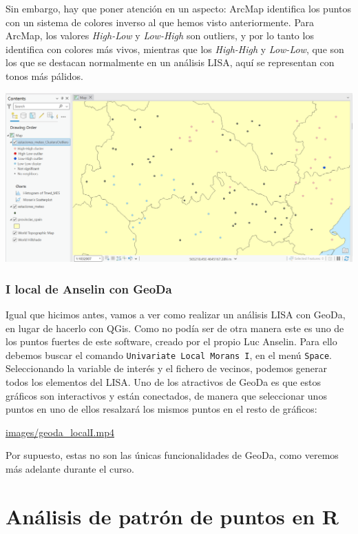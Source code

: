 \documentclass[
  letterpaper,
  DIV=11,
  numbers=noendperiod]{scrreprt}
\begin{document}
Sin embargo, hay que poner atención en un aspecto: ArcMap identifica los
puntos con un sistema de colores inverso al que hemos visto
anteriormente. Para ArcMap, los valores \emph{High-Low} y
\emph{Low-High} son outliers, y por lo tanto los identifica con colores
más vivos, mientras que los \emph{High-High} y \emph{Low-Low}, que son
los que se destacan normalmente en un análisis LISA, aquí se representan
con tonos más pálidos.

\includegraphics{images/Anselin_03_ArcGis.png}

\hypertarget{i-local-de-anselin-con-geoda}{%
\subsection{I local de Anselin con
GeoDa}\label{i-local-de-anselin-con-geoda}}

Igual que hicimos antes, vamos a ver como realizar un análisis LISA con
GeoDa, en lugar de hacerlo con QGis. Como no podía ser de otra manera
este es uno de los puntos fuertes de este software, creado por el propio
Luc Anselin. Para ello debemos buscar el comando
\texttt{Univariate\ Local\ Moran\textquotesingle{}s\ I}, en el menú
\texttt{Space}. Seleccionando la variable de interés y el fichero de
vecinos, podemos generar todos los elementos del LISA. Uno de los
atractivos de GeoDa es que estos gráficos son interactivos y están
conectados, de manera que seleccionar unos puntos en uno de ellos
resalzará los mismos puntos en el resto de gráficos:

\url{images/geoda_localI.mp4}

Por supuesto, estas no son las únicas funcionalidades de GeoDa, como
veremos más adelante durante el curso.

\hypertarget{sec-PointPattern}{%
\chapter{Análisis de patrón de puntos en R}\label{sec-PointPattern}}
\end{document}
